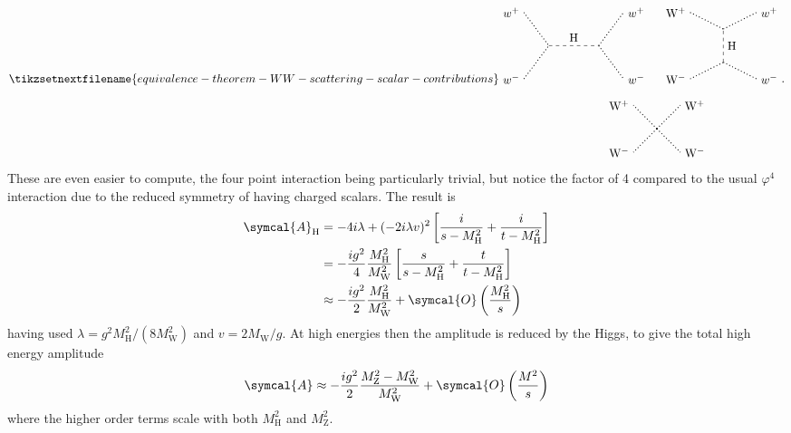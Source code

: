 \documentclass[fleqn]{NotesClass}
\newcommand{\Pparticle}[1]{\mathrm{#1}}
\newcommand{\PZ}{\ensuremath{\Pparticle{Z}}}
\newcommand{\PW}{\ensuremath{\Pparticle{W}}}
\newcommand{\PWp}{\ensuremath{\Pparticle{W}^{+}}}
\newcommand{\PWm}{\ensuremath{\Pparticle{W}^{-}}}
\newcommand{\Phiggs}{\ensuremath{\Pparticle{H}}}
\newcommand{\amplitude}{\symcal{A}}
\newcommand{\order}{\symcal{O}}
\begin{document}
    \begin{equation}
        \tikzsetnextfilename{equivalence-theorem-WW-scattering-scalar-contributions}
        \begin{tikzpicture}[baseline=(current bounding box)]
            \draw[dotted, thick] (-1, -1) node [left] {\(w^-\)} -- (-0.25, 0);
            \draw[dotted, thick] (-1, 1) node [left] {\(w^+\)} -- (-0.25, 0);
            \draw[dashed] (-0.25, 0) -- (1.25, 0) node [midway, above] {\Phiggs};
            \draw[dotted, thick] (1.25, 0) -- (2, -1) node [right] {\(w^-\)};
            \draw[dotted, thick] (1.25, 0) -- (2, 1) node [right] {\(w^+\)};
            \draw[dotted, thick] (4, -1) node [left] {\(\PWm\)} -- (5, -0.5);
            \draw[dotted, thick] (4, 1) node [left] {\(\PWp\)} -- (5, 0.5);
            \draw[dotted, thick] (5, -0.5) -- (6, -1) node [right] {\(w^-\)};
            \draw[dotted, thick] (5, 0.5) -- (6, 1) node [right] {\(w^+\)};
            \draw[dashed] (5, -0.5) -- (5, 0.5) node [midway, right] {\Phiggs};
            \begin{scope}[xshift=3cm, yshift=-2.5cm]
                \draw[dotted, thick] (0, 0) -- ++ (45:1) node [right] {\(\PWp\)};
                \draw[dotted, thick] (0, 0) -- ++ (135:1) node [left] {\(\PWp\)};
                \draw[dotted, thick] (0, 0) -- ++ (225:1) node [left] {\(\PWm\)};
                \draw[dotted, thick] (0, 0) -- ++ (315:1) node [right] {\(\PWm\)};
            \end{scope}
        \end{tikzpicture}
        .
    \end{equation}
    These are even easier to compute, the four point interaction being particularly trivial, but notice the factor of 4 compared to the usual \(\varphi^4\) interaction due to the reduced symmetry of having charged scalars.
    The result is
    \begin{align}
        \amplitude_{\Phiggs} &= -4i\lambda + (-2i\lambda v)^2 \left[ \frac{i}{s - M_{\Phiggs}^2} + \frac{i}{t - M_{\Phiggs}^2} \right]\\
        &= -\frac{ig^2}{4} \frac{M_{\Phiggs}^2}{M_{\PW}^2} \left[ \frac{s}{s - M_{\Phiggs}^2} + \frac{t}{t - M_{\Phiggs}^2} \right]\\
        &\approx -\frac{ig^2}{2} \frac{M_{\Phiggs}^2}{M_{\PW}^2} + \order\left( \frac{M_{\Phiggs}^2}{s} \right)
    \end{align}
    having used \(\lambda = g^2M_{\Phiggs}^2/(8M_{\PW}^2)\) and \(v = 2M_{\PW}/g\).
    At high energies then the amplitude is reduced by the Higgs, to give the total high energy amplitude
    \begin{equation}
        \amplitude \approx -\frac{ig^2}{2}\frac{M_{\PZ}^2 - M_{\PW}^2}{M_{\PW}^2} + \order\left( \frac{M^2}{s} \right)
    \end{equation}
    where the higher order terms scale with both \(M_{\Phiggs}^2\) and \(M_{\PZ}^2\).
    
\end{document}
